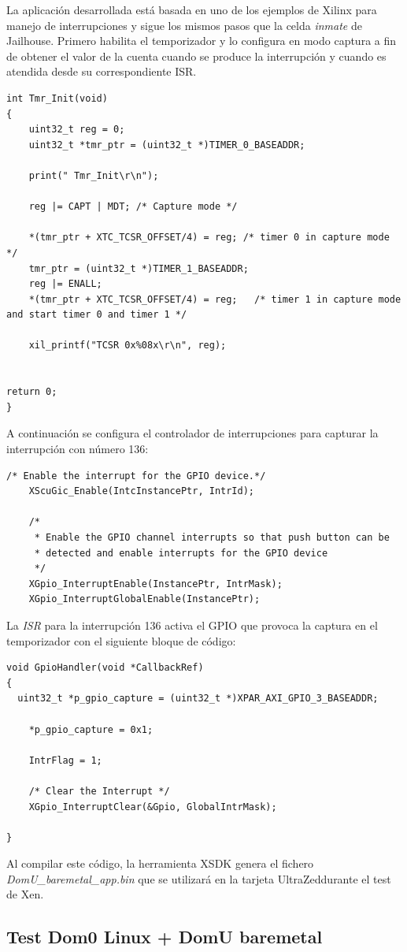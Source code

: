 La aplicación desarrollada está basada en uno de los ejemplos de Xilinx para manejo de interrupciones y sigue los mismos pasos que la celda \textit{inmate} de Jailhouse.
Primero habilita el temporizador y lo configura en modo captura a fin de obtener el valor de la cuenta cuando se produce la interrupción y cuando es atendida desde su correspondiente \acrshort{ISR}.

\begin{lstlisting}[style=CStyle]
int Tmr_Init(void)
{
	uint32_t reg = 0;
	uint32_t *tmr_ptr = (uint32_t *)TIMER_0_BASEADDR;

	print(" Tmr_Init\r\n");

	reg |= CAPT | MDT; /* Capture mode */

	*(tmr_ptr + XTC_TCSR_OFFSET/4) = reg; /* timer 0 in capture mode */
	tmr_ptr = (uint32_t *)TIMER_1_BASEADDR;
	reg |= ENALL;
	*(tmr_ptr + XTC_TCSR_OFFSET/4) = reg;   /* timer 1 in capture mode and start timer 0 and timer 1 */

	xil_printf("TCSR 0x%08x\r\n", reg);


return 0;
}
\end{lstlisting}

A continuación se configura el controlador de interrupciones para capturar la interrupción con número 136:
\begin{lstlisting}[style=CStyle]
/* Enable the interrupt for the GPIO device.*/
	XScuGic_Enable(IntcInstancePtr, IntrId);

	/*
	 * Enable the GPIO channel interrupts so that push button can be
	 * detected and enable interrupts for the GPIO device
	 */
	XGpio_InterruptEnable(InstancePtr, IntrMask);
	XGpio_InterruptGlobalEnable(InstancePtr);
\end{lstlisting}

La \textit{ISR} para la interrupción 136 activa el \acrshort{GPIO} que provoca la captura en el temporizador con el siguiente bloque de código:
\begin{lstlisting}[style=CStyle]
void GpioHandler(void *CallbackRef)
{
  uint32_t *p_gpio_capture = (uint32_t *)XPAR_AXI_GPIO_3_BASEADDR;

	*p_gpio_capture = 0x1;

	IntrFlag = 1;

	/* Clear the Interrupt */
	XGpio_InterruptClear(&Gpio, GlobalIntrMask);

}
\end{lstlisting}

Al compilar este código, la herramienta \acrshort{XSDK} genera el fichero \textit{DomU_baremetal_app.bin} que se utilizará en la tarjeta UltraZed\texttrademark durante el test de Xen.

\subsection{Test Dom0 Linux + DomU baremetal} \label{section:text_xen}

